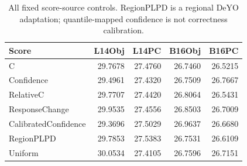 \begin{table}[htbp]
\centering\scriptsize
\caption{All fixed score-source controls. RegionPLPD is a regional DeYO adaptation; quantile-mapped confidence is not correctness calibration.}
\label{tab:scores}
\setlength{\tabcolsep}{4pt}
\begin{tabular}{lrrrr}
\toprule
Score & L14Obj & L14PC & B16Obj & B16PC \\
\midrule
C & 29.7678 & 27.4760 & 26.7460 & 26.5215 \\
Confidence & 29.4961 & 27.4320 & 26.7509 & 26.7667 \\
RelativeC & 29.7707 & 27.4420 & 26.8064 & 26.5431 \\
ResponseChange & 29.9535 & 27.4556 & 26.8503 & 26.7009 \\
CalibratedConfidence & 29.3696 & 27.5029 & 26.9637 & 26.6680 \\
RegionPLPD & 29.7853 & 27.5383 & 26.7531 & 26.6109 \\
Uniform & 30.0534 & 27.4105 & 26.7596 & 26.7151 \\
\bottomrule
\end{tabular}
\end{table}
